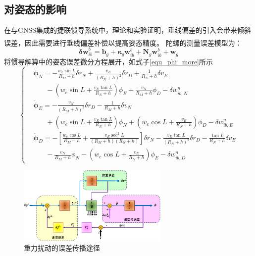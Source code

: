 \documentclass[12pt,a4,utf8]{article}
\newcommand{\upcite}[1]{\textsuperscript{\textsuperscript{\cite{#1}}}} %
\begin{document}
\subsection{对姿态的影响}
在与GNSS集成的捷联惯导系统中，理论和实验证明，垂线偏差的引入会带来倾斜误差，因此需要进行垂线偏差补偿以提高姿态精度\upcite{grejner1998gravity,dai2015dynamic}。
陀螺的测量误差模型为：
\begin{equation}
      \bm{\delta w}^b_{ib} = \bm{b}_g + \bm{\kappa}_g \bm{ w}^b_{ib} + \bm{N}_g \bm{ w}^b_{ib} + \bm{w}_g
      \label{gyro_bias}
\end{equation}
将惯导解算中的姿态误差微分方程展开，如式子\ref{equ_phi_more}所示
\begin{equation}
            \left\{ \begin{aligned}
            & \dot{\bm{\phi}}_N=-\frac{w_e\sin L}{R_M + h}\delta r_N+\frac{v_E}{(R_N+h)^2}\delta r_D + \frac{1}{R_N + h}\delta v_E \\
            & \ \ \ \ \ \ \ \ - \left ( w_e\sin L + \frac{v_E\tan L}{R_N +h} \right )\phi_E + \frac{v_N}{R_M+h}\phi_D - \delta w^n_{ib,N} \\ 
            & \dot{\bm{\phi}}_E= - \frac{v_N}{(R_M + h)^2}\delta r_D - \frac{1}{R_M + h }\delta v_N \\
            & \ \ \ \ \ \ \ \ + \left ( w_e \sin L + \frac{v_E\tan L}{R_N + h} \right )\phi_N + \left ( w_e \cos L +\frac{v_E}{R_N + h} \right )\phi_D - \delta w^n_{ib,E}\\ 
            & \dot{\bm{\phi}}_D= - \left [ \frac{w_e\cos L}{R_M + h}+ \frac{v_E\sec ^2L}{(R_M + h)(R_N + h)}\right ]\delta r_N - \frac{v_E \tan L}{(R_N+h)^2}\delta r_D - \frac{\tan L}{R_N + h}\delta v_E \\
            & \ \ \ \ \ \ \ \ - \frac{v_N}{R_M + h}\phi_N - \left ( w_e \cos L + \frac{v_E}{R_N + h } \right )\phi_E - \delta w^n_{ib,D}
      \end{aligned} \right.
      \label{equ_phi_more}
\end{equation}

\begin{figure}[h]
      \centering
      \includegraphics[width=0.65\textwidth]{figure/fig_error_sep-crop.pdf}
      \caption{\label{fig:error_sep}重力扰动的误差传播途径}
\end{figure}
\end{document}
